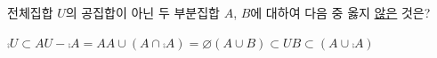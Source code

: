 전체집합 $U$의 공집합이 아닌 두 부분집합 $A$, $B$에 대하여 다음 중 옳지 \underline{않은} 것은?
\begin{choicesii}{$\comp{U}\subset A$}{$U-\comp{A}=A$}{$A\cup(A\cap\comp{A})=\varnothing$}{$(A\cup B)\subset U$}{$B\subset(A\cup\comp{A})$}\end{choicesii}
